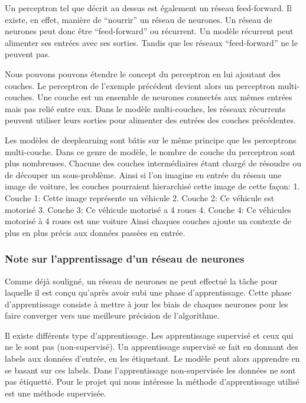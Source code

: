 \documentclass[a4paper,10pt,openany,oneside]{sphinxmanual}
\begin{document}
Un perceptron tel que décrit au dessus est également un réseau feed-forward. Il existe, en effet, manière de ``nourrir'' un réseau de neurones.
Un réseau de neurones peut donc être ``feed-forward'' ou récurrent. Un modèle récurrent peut alimenter ses entrées avec ses sorties. Tandis que
les réseaux ``feed-forward'' ne le peuvent pas.

Nous pouvons pouvons étendre le concept du perceptron en lui ajoutant des couches. Le perceptron de l'exemple précédent devient alors un
perceptron multi-couches. Une couche est un ensemble de neurones connectés aux mêmes entrées mais pas relié entre eux. Dans le modèle
multi-couches, les réseaux récurrents peuvent utiliser leurs sorties pour alimenter des entrées des couches précédentes.

Les modèles de deeplearning sont bâtis sur le même principe que les perceptrons multi-couche. Dans ce genre de modèle, le nombre de couche
du perceptron sont plus nombreuses. Chacune des couches intermédiaires étant chargé de résoudre ou de découper un sous-problème. Ainsi si
l'on imagine en entrée du réseau une image de voiture, les couches pourraient hierarchisé cette image de cette façon:
1. Couche 1: Cette image représente un véhicule
2. Couche 2: Ce véhicule est motorisé
3. Couche 3: Ce véhicule motorisé a 4 roues
4. Couche 4: Ce véhicules motorisé à 4 roues est une voiture
Ainsi chaques couches ajoute un contexte de plus en plus précis aux données passées en entrée.


\subsubsection{Note sur l'apprentissage d'un réseau de neurones}
\label{index:note-sur-l-apprentissage-d-un-reseau-de-neurones}
Comme déjà souligné, un réseau de neurones ne peut effectué la tâche pour laquelle il est conçu qu'après avoir subi une phase d'apprentissage.
Cette phase d'apprentissage consiste à mettre à jour les biais de chaques neurones pour les faire converger vers une meilleure précision
de l'algorithme.

Il existe différents type d'apprentissage. Les apprentissage supervisé et ceux qui ne le sont pas (non-supervisé). Un apprentissage supervisé
se fait en donnant des labels aux données d'entrée, en les étiquetant. Le modèle peut alors apprendre en se basant sur ces labels. Dans
l'apprentissage non-supervisée les données ne sont pas étiquetté. Pour le projet qui nous intéresse la méthode d'apprentissage utilisé
est une méthode supervisée.
\end{document}
